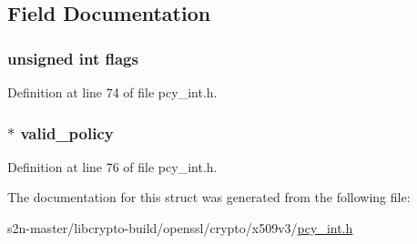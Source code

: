 \subsection{Field Documentation}
\subsubsection[{\texorpdfstring{flags}{flags}}]{\setlength{\rightskip}{0pt plus 5cm}unsigned int flags}\hypertarget{struct_x509___p_o_l_i_c_y___d_a_t_a__st_ac92588540e8c1d014a08cd8a45462b19}{}\label{struct_x509___p_o_l_i_c_y___d_a_t_a__st_ac92588540e8c1d014a08cd8a45462b19}


Definition at line 74 of file pcy\+\_\+int.\+h.

\subsubsection[{\texorpdfstring{valid\+\_\+policy}{valid_policy}}]{$\ast$ valid\+\_\+policy}\hypertarget{struct_x509___p_o_l_i_c_y___d_a_t_a__st_af23a5c0eb540eec54880de1c649a064d}{}\label{struct_x509___p_o_l_i_c_y___d_a_t_a__st_af23a5c0eb540eec54880de1c649a064d}


Definition at line 76 of file pcy\+\_\+int.\+h.



The documentation for this struct was generated from the following file\+:\begin{DoxyCompactItemize}
\item 
s2n-\/master/libcrypto-\/build/openssl/crypto/x509v3/\hyperlink{pcy__int_8h}{pcy\+\_\+int.\+h}\end{DoxyCompactItemize}
